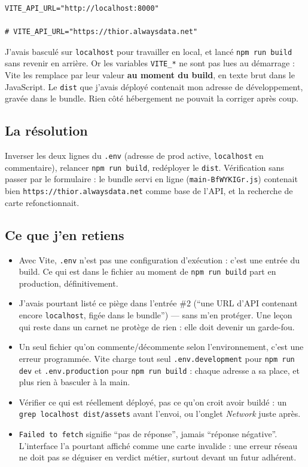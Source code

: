 \documentclass[10pt,twoside,openany]{article}
\begin{document}
\begin{lstlisting}
VITE_API_URL="http://localhost:8000"

# VITE_API_URL="https://thior.alwaysdata.net"
\end{lstlisting}

J'avais basculé sur \texttt{localhost} pour travailler en local, et lancé \texttt{npm run build} sans revenir en arrière. Or les variables \texttt{VITE\_*} ne sont pas lues au démarrage : Vite les remplace par leur valeur \textbf{au moment du build}, en texte brut dans le JavaScript. Le \texttt{dist} que j'avais déployé contenait mon adresse de développement, gravée dans le bundle. Rien côté hébergement ne pouvait la corriger après coup.

\subsection*{La résolution}
Inverser les deux lignes du \texttt{.env} (adresse de prod active, \texttt{localhost} en commentaire), relancer \texttt{npm run build}, redéployer le \texttt{dist}. Vérification sans passer par le formulaire : le bundle servi en ligne (\texttt{main-BfWYKIGr.js}) contenait bien \texttt{https://thior.alwaysdata.net} comme base de l'API, et la recherche de carte refonctionnait.

\subsection*{Ce que j'en retiens}
\begin{itemize}
  \item Avec Vite, \texttt{.env} n'est pas une configuration d'exécution : c'est une entrée du build. Ce qui est dans le fichier au moment de \texttt{npm run build} part en production, définitivement.
  \item J'avais pourtant listé ce piège dans l'entrée \#2 (\enquote{une URL d'API contenant encore \texttt{localhost}, figée dans le bundle}) --- sans m'en protéger. Une leçon qui reste dans un carnet ne protège de rien : elle doit devenir un garde-fou.
  \item Un seul fichier qu'on commente/décommente selon l'environnement, c'est une erreur programmée. Vite charge tout seul \texttt{.env.development} pour \texttt{npm run dev} et \texttt{.env.production} pour \texttt{npm run build} : chaque adresse a sa place, et plus rien à basculer à la main.
  \item Vérifier ce qui est réellement déployé, pas ce qu'on croit avoir buildé : un \texttt{grep localhost dist/assets} avant l'envoi, ou l'onglet \textit{Network} juste après.
  \item \texttt{Failed to fetch} signifie \enquote{pas de réponse}, jamais \enquote{réponse négative}. L'interface l'a pourtant affiché comme une carte invalide : une erreur réseau ne doit pas se déguiser en verdict métier, surtout devant un futur adhérent.
\end{itemize}
\end{document}
